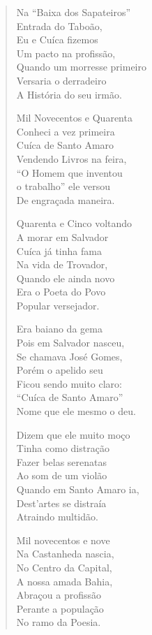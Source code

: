 \begin{verse}
Na ``Baixa dos Sapateiros'' \\
Entrada do Taboão, \\
Eu e Cuíca fizemos \\
Um pacto na profissão, \\
Quando um morresse primeiro \\
Versaria o derradeiro \\
A História do seu irmão. 

Mil Novecentos e Quarenta \\
Conheci a vez primeira \\
Cuíca de Santo Amaro \\
Vendendo Livros na feira, \\
``O Homem que inventou \\
o trabalho'' ele versou \\
De engraçada maneira. 

Quarenta e Cinco voltando \\
A morar em Salvador \\
Cuíca já tinha fama \\
Na vida de Trovador, \\
Quando ele ainda novo \\
Era o Poeta do Povo \\
Popular versejador. 


Era baiano da gema \\
Pois em Salvador nasceu, \\
Se chamava José Gomes, \\
Porém o apelido seu \\
Ficou sendo muito claro: \\
``Cuíca de Santo Amaro'' \\
Nome que ele mesmo o deu. 

Dizem que ele muito moço \\
Tinha como distração \\
Fazer belas serenatas \\
Ao som de um violão \\
Quando em Santo Amaro ia, \\
Dest'artes se distraía \\
Atraindo multidão. 

Mil novecentos e nove \\
Na Castanheda nascia, \\
No Centro da Capital, \\
A nossa amada Bahia, \\
Abraçou a profissão \\
Perante a população \\
No ramo da Poesia. 


\end{verse}
